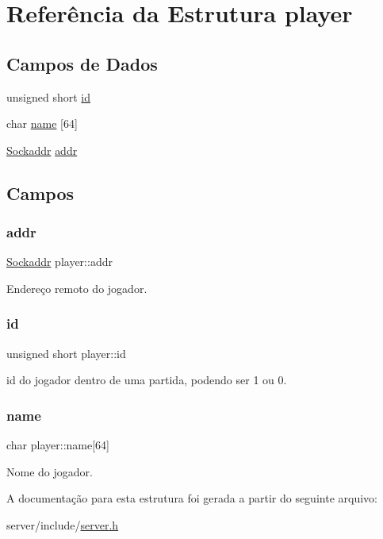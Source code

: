 \hypertarget{structplayer}{}\section{Referência da Estrutura player}
\label{structplayer}
\subsection*{Campos de Dados}
\begin{DoxyCompactItemize}
\item 
unsigned short \hyperlink{structplayer_a0e6fb0e744015cdf9f4dd12164a1dbaa}{id}
\item 
char \hyperlink{structplayer_a6db5a6f2e823dfebcbc3548bfb4bda99}{name} \mbox{[}64\mbox{]}
\item 
\hyperlink{server_8h_a2645d40a71683d956e55bcf7a6823530}{Sockaddr} \hyperlink{structplayer_a7b6c5d24a563be91d800cd5ed7d639e1}{addr}
\end{DoxyCompactItemize}


\subsection{Campos}
\mbox{\label{structplayer_a7b6c5d24a563be91d800cd5ed7d639e1}} 
\subsubsection{\texorpdfstring{addr}{addr}}
{\footnotesize\ttfamily \hyperlink{server_8h_a2645d40a71683d956e55bcf7a6823530}{Sockaddr} player\+::addr}

Endereço remoto do jogador. \mbox{\label{structplayer_a0e6fb0e744015cdf9f4dd12164a1dbaa}} 
\subsubsection{\texorpdfstring{id}{id}}
{\footnotesize\ttfamily unsigned short player\+::id}

id do jogador dentro de uma partida, podendo ser 1 ou 0. \mbox{\label{structplayer_a6db5a6f2e823dfebcbc3548bfb4bda99}} 
\subsubsection{\texorpdfstring{name}{name}}
{\footnotesize\ttfamily char player\+::name\mbox{[}64\mbox{]}}

Nome do jogador. 

A documentação para esta estrutura foi gerada a partir do seguinte arquivo\+:\begin{DoxyCompactItemize}
\item 
server/include/\hyperlink{server_8h}{server.\+h}\end{DoxyCompactItemize}
